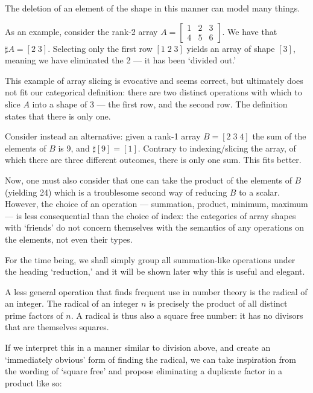 \documentclass{DIKU-report-variant}
\begin{document}
The deletion of an element of the shape in this manner can model many things.

As an example,
consider the rank-2 array \(A = \left[\begin{smallmatrix} 1 & 2 & 3 \\ 4 & 5 & 6 \end{smallmatrix}\right]\).
We have that \(\sharp A = [2\; 3]\). Selecting only the first row \([1\;2\;3]\) yields an array of shape \([3]\),
meaning we have eliminated the 2 --- it has been `divided out.'

This example of array slicing is evocative and seems correct, but ultimately does not fit our categorical
definition: there are two distinct operations with which to slice \(A\) into a shape of 3 --- the first row,
and the second row. The definition states that there is only one.

Consider instead an alternative: given a rank-1 array \(B = [2\;3\;4]\) the sum of the
elements of \(B\) is 9, and \(\sharp [9] = [1]\). Contrary to indexing/slicing the array, of which there are
three different outcomes, there is only one sum. This fits better.

Now, one must also consider that one can take the product of the elements of \(B\) (yielding 24) which
is a troublesome second way of reducing \(B\) to a scalar. However, the choice of an operation --- summation,
product, minimum, maximum --- is less consequential than the choice of index: the categories of
array shapes with `friends' do not concern themselves with the semantics of any operations on the elements,
not even their types.

For the time being, we shall simply group all summation-like operations under the heading `reduction,' and
it will be shown later why this is useful and elegant.

A less general operation that finds frequent use in number theory is the radical of an integer. The
radical of an integer \(n\) is precisely the product of all distinct prime factors of \(n\). A radical
is thus also a square free number: it has no divisors that are themselves squares.

If we interpret this in a manner similar to division above, and create an `immediately obvious' form
of finding the radical, we can take inspiration from the wording of `square free' and propose eliminating
a duplicate factor in a product like so:
\end{document}
